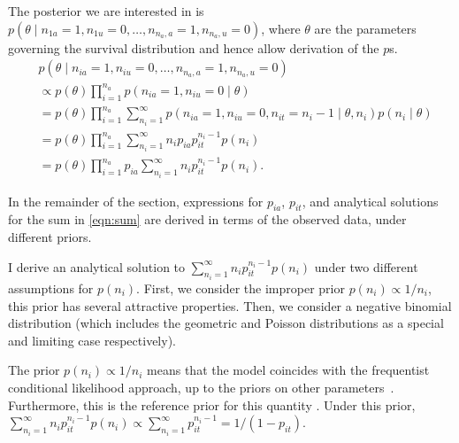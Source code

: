 \documentclass[thesis.tex]{subfiles}
\begin{document}
The posterior we are interested in is
$p(\theta \mid n_{1a} = 1, n_{1u} = 0, \dots, n_{n_a,a} = 1, n_{n_a,u} = 0)$,
where $\theta$ are the parameters governing the survival distribution
and hence allow derivation of the $p$s.
\begin{align}
&p(\theta \mid n_{ia} = 1, n_{iu} = 0, \dots, n_{n_a,a} = 1, n_{n_a,u} = 0) \\
&\propto p(\theta) \prod_{i=1}^{n_a} p(n_{ia} = 1, n_{iu} = 0 \mid \theta) \\
&= p(\theta) \prod_{i=1}^{n_a} \sum_{n_i=1}^\infty p(n_{ia} = 1, n_{iu} = 0, n_{it} = n_i - 1 \mid \theta, n_i) p(n_i \mid \theta) \\
&= p(\theta) \prod_{i=1}^{n_a} \sum_{n_i=1}^\infty n_i p_{ia} p_{it}^{n_i- 1} p(n_i) \\
&= p(\theta) \prod_{i=1}^{n_a} p_{ia} \sum_{n_i=1}^\infty n_i p_{it}^{n_i- 1} p(n_i).\label{eqn:sum}
\end{align}


In the remainder of the section, expressions for $p_{ia}$,
$p_{it}$, and analytical solutions for the sum in \cref{eqn:sum} are derived in terms of the observed data, 
under different priors.

I derive an analytical solution to $\sum_{n_i=1}^\infty n_i p_{it}^{n_i- 1} p(n_i)$ under two different assumptions for $p(n_i)$.
First, we consider the improper prior $p(n_i) \propto 1/n_i$, this prior has several attractive properties.
Then, we consider a negative binomial distribution (which includes the geometric and Poisson distributions as a special and limiting case respectively).

The prior $p(n_i) \propto 1/n_i$ means that the model coincides with the frequentist conditional likelihood approach, up to the priors on other parameters~\cites[section 4.2]{dempsterMaximum}{heiseyModelling}[section 8.7.5]{gelmanBayesian}.
Furthermore, this is the reference prior for this quantity \autocite{heBayesiana}.
Under this prior,
$\sum_{n_i=1}^\infty n_i p_{it}^{n_i- 1} p(n_i) \propto \sum_{n_i=1}^\infty p_{it}^{n_i-1} = 1/(1-p_{it})$.
\end{document}
